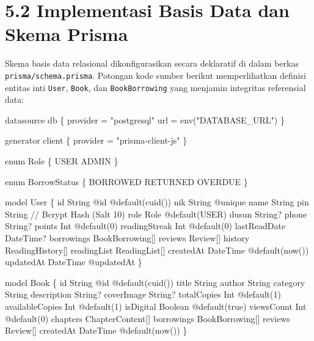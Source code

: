\documentclass[
  indonesian,
  12pt,
]{report}
\newenvironment{Shaded}{}{}
\newcommand{\NormalTok}[1]{#1}
\begin{document}
\section{5.2 Implementasi Basis Data dan Skema
Prisma}\label{implementasi-basis-data-dan-skema-prisma}

Skema basis data relasional dikonfigurasikan secara deklaratif di dalam
berkas \texttt{prisma/schema.prisma}. Potongan kode sumber berikut
memperlihatkan definisi entitas inti \texttt{User}, \texttt{Book}, dan
\texttt{BookBorrowing} yang menjamin integritas referensial data:

\begin{Shaded}
\begin{Highlighting}[]
\NormalTok{datasource db \{}
\NormalTok{  provider = "postgresql"}
\NormalTok{  url      = env("DATABASE\_URL")}
\NormalTok{\}}

\NormalTok{generator client \{}
\NormalTok{  provider = "prisma{-}client{-}js"}
\NormalTok{\}}

\NormalTok{enum Role \{}
\NormalTok{  USER}
\NormalTok{  ADMIN}
\NormalTok{\}}

\NormalTok{enum BorrowStatus \{}
\NormalTok{  BORROWED}
\NormalTok{  RETURNED}
\NormalTok{  OVERDUE}
\NormalTok{\}}

\NormalTok{model User \{}
\NormalTok{  id            String          @id @default(cuid())}
\NormalTok{  nik           String          @unique}
\NormalTok{  name          String}
\NormalTok{  pin           String          // Bcrypt Hash (Salt 10)}
\NormalTok{  role          Role            @default(USER)}
\NormalTok{  dusun         String?}
\NormalTok{  phone         String?}
\NormalTok{  points        Int             @default(0)}
\NormalTok{  readingStreak Int             @default(0)}
\NormalTok{  lastReadDate  DateTime?}
\NormalTok{  borrowings    BookBorrowing[]}
\NormalTok{  reviews       Review[]}
\NormalTok{  history       ReadingHistory[]}
\NormalTok{  readingList   ReadingList[]}
\NormalTok{  createdAt     DateTime        @default(now())}
\NormalTok{  updatedAt     DateTime        @updatedAt}
\NormalTok{\}}

\NormalTok{model Book \{}
\NormalTok{  id              String          @id @default(cuid())}
\NormalTok{  title           String}
\NormalTok{  author          String}
\NormalTok{  category        String}
\NormalTok{  description     String?}
\NormalTok{  coverImage      String?}
\NormalTok{  totalCopies     Int             @default(1)}
\NormalTok{  availableCopies Int             @default(1)}
\NormalTok{  isDigital       Boolean         @default(true)}
\NormalTok{  viewsCount      Int             @default(0)}
\NormalTok{  chapters        ChapterContent[]}
\NormalTok{  borrowings      BookBorrowing[]}
\NormalTok{  reviews         Review[]}
\NormalTok{  createdAt       DateTime        @default(now())}
\NormalTok{\}}


\end{Highlighting}
\end{Shaded}
\end{document}
